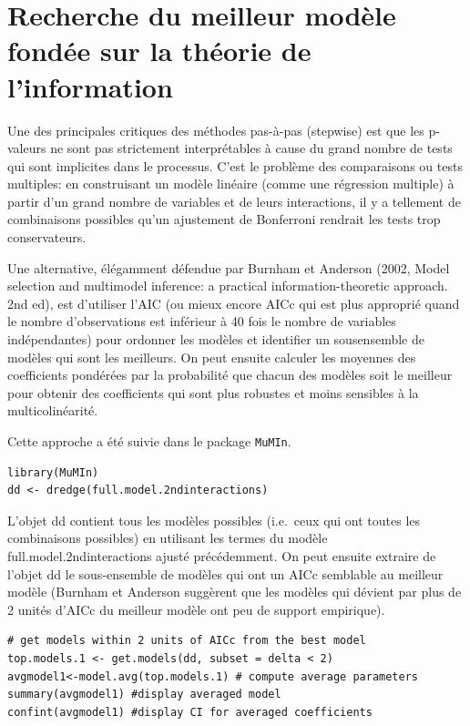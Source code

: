 \documentclass[12pt,]{book}
\begin{document}
\hypertarget{recherche-du-meilleur-moduxe8le-fonduxe9e-sur-la-thuxe9orie-de-linformation}{%
\section{Recherche du meilleur modèle fondée sur la théorie de l'information}\label{recherche-du-meilleur-moduxe8le-fonduxe9e-sur-la-thuxe9orie-de-linformation}}

Une des principales critiques des méthodes pas-à-pas (stepwise) est que les p-valeurs ne sont pas strictement interprétables à cause du grand nombre de tests qui sont implicites dans le processus. C'est le problème des comparaisons ou tests multiples: en construisant un modèle linéaire (comme une régression multiple) à partir d'un grand nombre de variables et de leurs interactions, il y a tellement de combinaisons possibles qu'un ajustement de Bonferroni rendrait les tests trop conservateurs.

Une alternative, élégamment défendue par Burnham et Anderson (2002, Model selection and multimodel inference: a practical information-theoretic approach. 2nd ed), est d'utiliser l'AIC (ou mieux encore AICc qui est plus approprié quand le nombre d'observations est inférieur à 40 fois le nombre de variables indépendantes) pour ordonner les modèles et identifier un sousensemble de modèles qui sont les meilleurs. On peut ensuite calculer les moyennes des coefficients pondérées par la probabilité que chacun des modèles soit le meilleur pour obtenir des coefficients qui sont plus robustes et moins sensibles à la multicolinéarité.

Cette approche a été suivie dans le package \texttt{MuMIn}.

\begin{verbatim}
library(MuMIn)
dd <- dredge(full.model.2ndinteractions)
\end{verbatim}

L'objet dd contient tous les modèles possibles (i.e.~ceux qui ont toutes les combinaisons possibles) en utilisant les termes du modèle full.model.2ndinteractions ajusté précédemment. On peut ensuite extraire de l'objet dd le sous-ensemble de modèles qui ont un AICc semblable au meilleur modèle (Burnham et Anderson suggèrent que les modèles qui dévient par plus de 2 unités d'AICc du meilleur modèle ont peu de support empirique).

\begin{verbatim}
# get models within 2 units of AICc from the best model
top.models.1 <- get.models(dd, subset = delta < 2)
avgmodel1<-model.avg(top.models.1) # compute average parameters
summary(avgmodel1) #display averaged model
confint(avgmodel1) #display CI for averaged coefficients
\end{verbatim}
\end{document}
